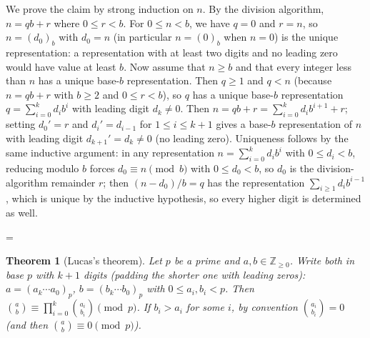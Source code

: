 \documentclass[11pt]{article}
\makeatletter
\theoremstyle{ntstyle}
\newtheorem{theorem}{Theorem}[subsection]
\let\nt@closedisplay\]
\def\nt@guardedclose{\@ifnextchar\par{\nt@closeafterpar}{\@ifnextchar\end{\postdisplaypenalty\@M\nt@closedisplay}{\nt@closedisplay}}}
\def\nt@closeafterpar\par{\@ifnextchar\par{\nt@closeafterpar}{\@ifnextchar\end{\postdisplaypenalty\@M\nt@closedisplay\par}{\nt@closedisplay\par}}}
\renewenvironment{proof}[1][\proofname]{\par
  \pushQED{\qed}\normalfont\topsep\medskipamount\edef\nt@afterproof{\@endparpenalty=\the\@endparpenalty\relax}\@beginparpenalty\@M\@endparpenalty\@M\let\]\nt@guardedclose\trivlist\item[]\textit{#1\@addpunct{.}} \ignorespaces}{\ifvmode\addpenalty\@M\fi\popQED\nt@afterproof\endtrivlist\@endpefalse}
\makeatother
\begin{document}
\begin{proof} We prove the claim by strong induction on $n$. By the
	division algorithm, $n = qb + r$ where $0 \le r < b$. For
	$0 \le n < b$, we have $q = 0$ and $r = n$, so $n = (d_0)_b$ with $d_0 = n$
	(in particular $n = (0)_b$ when $n = 0$) is the unique
	representation: a representation with at least two digits and no leading
	zero would have value at least $b$. Now assume that $n \ge b$ and that every integer
	less than $n$ has a unique base-$b$ representation. Then $q\ge1$ and $q<n$ (because $n=qb+r$ with $b\ge2$ and $0\le r<b$), so $q$ has a unique base-$b$
	representation $q = \sum_{i=0}^{k} d_i b^{i}$ with leading digit $d_k
		\neq 0$. Then $n = qb + r = \sum_{i=0}^{k} d_i b^{i+1} + r$; setting
	$d_0' = r$ and $d_i' = d_{i-1}$ for $1\le i\le k+1$ gives a base-$b$
	representation of $n$ with leading digit $d_{k+1}' = d_k \neq 0$ (no leading
	zero). Uniqueness follows by the same inductive argument: in any representation
	$n = \sum_{i=0}^{k}d_i b^i$ with $0 \le d_i < b$, reducing modulo $b$
	forces $d_0 \equiv n \pmod{b}$ with $0 \le d_0 < b$, so $d_0$ is the
	division-algorithm remainder $r$; then $(n - d_0)/b = q$ has
	the representation $\sum_{i \ge 1} d_i b^{i-1}$, which is unique by the inductive
	hypothesis, so every higher digit is determined as well.

\end{proof}
\begin{theorem}[Lucas's theorem]\label{thm:4.1.2} Let $p$ be a
	prime and $a, b \in \mathbb{Z}_{\ge0}$. Write both in base $p$ with $k+1$ digits
	(padding the shorter one with leading zeros): $a = (a_k
		\cdots a_0)_p$, $b = (b_k \cdots b_0)_p$ with $0 \le a_i, b_i < p$.
	Then $\binom{a}{b} \equiv \prod_{i=0}^{k} \binom{a_i}{b_i} \pmod{p}$.
	If $b_i>a_i$ for some $i$, by convention $\binom{a_i}{b_i}=0$ (and then $\binom{a}{b}\equiv 0 \pmod{p}$).

\end{theorem}
\end{document}
